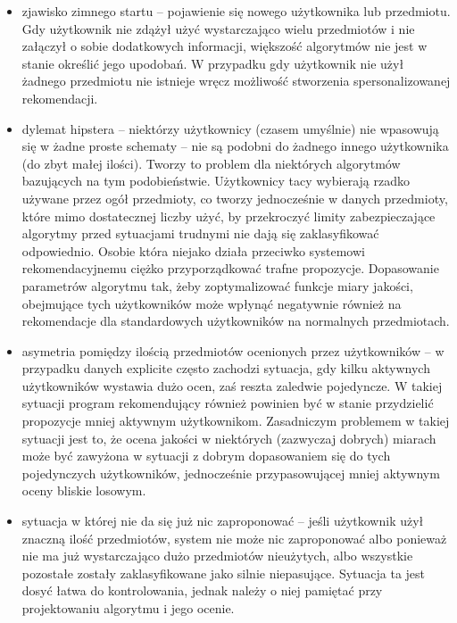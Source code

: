 \documentclass{pracamgr}
\begin{document}
   \begin{itemize}\itemsep1pt \parskip0pt 
    \item zjawisko zimnego startu -- pojawienie się nowego użytkownika lub przedmiotu.\newline
      Gdy użytkownik nie zdążył użyć wystarczająco wielu przedmiotów i nie załączył o sobie dodatkowych informacji,
      większość algorytmów nie jest w stanie określić jego upodobań.
      W przypadku gdy użytkownik nie użył żadnego przedmiotu nie istnieje wręcz możliwość stworzenia spersonalizowanej rekomendacji.
    \item dylemat hipstera -- niektórzy użytkownicy (czasem umyślnie) nie wpasowują się w żadne proste schematy --
     nie są podobni do żadnego innego użytkownika (do zbyt małej ilości). Tworzy to problem dla niektórych algorytmów bazujących na tym podobieństwie.\newline
     Użytkownicy tacy wybierają rzadko używane przez ogół przedmioty, co tworzy jednocześnie w danych przedmioty, które mimo dostatecznej liczby użyć,
     by przekroczyć limity zabezpieczające algorytmy przed sytuacjami trudnymi nie dają się zaklasyfikować odpowiednio.
     Osobie która niejako działa przeciwko systemowi rekomendacyjnemu ciężko przyporządkować trafne propozycje.
     Dopasowanie parametrów algorytmu tak, żeby zoptymalizować funkcje miary jakości,
     obejmujące tych użytkowników może wpłynąć negatywnie również na rekomendacje dla standardowych użytkowników na normalnych przedmiotach.
    \item asymetria pomiędzy ilością przedmiotów ocenionych przez użytkowników -- w przypadku danych explicite często zachodzi sytuacja,
     gdy kilku aktywnych użytkowników wystawia dużo ocen, zaś reszta zaledwie pojedyncze.\newline
     W takiej sytuacji program rekomendujący również powinien być w stanie przydzielić propozycje mniej aktywnym użytkownikom.
     Zasadniczym problemem w takiej sytuacji jest to, że ocena jakości w niektórych (zazwyczaj dobrych)
     miarach może być zawyżona w sytuacji z dobrym dopasowaniem się do tych pojedynczych użytkowników,
     jednocześnie przypasowującej mniej aktywnym oceny bliskie losowym.
    \item sytuacja w której nie da się już nic zaproponować -- jeśli użytkownik użył znaczną ilość przedmiotów,
     system nie może nic zaproponować albo ponieważ nie ma już wystarczająco dużo przedmiotów nieużytych,
     albo wszystkie pozostałe zostały zaklasyfikowane jako silnie niepasujące.\newline
     Sytuacja ta jest dosyć łatwa do kontrolowania, jednak należy o niej pamiętać przy projektowaniu algorytmu i jego ocenie. 
   \end{itemize}
   
\end{document}
